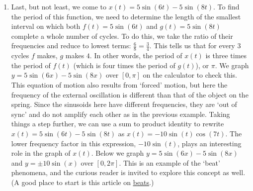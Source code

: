 {\begin{enumerate}
{}


\item Last, but not least, we come to  $x(t) = 5\sin(6t) - 5\sin(8t)$.  To find the period of this function, we need to determine the length of the smallest interval on which both $f(t) = 5\sin(6t)$ and $g(t) = 5\sin(8t)$ complete a whole number of cycles.  To do this, we take the ratio of their frequencies and reduce to lowest terms:  $\frac{6}{8} = \frac{3}{4}$.  This tells us that for every $3$ cycles $f$ makes, $g$ makes $4$. In other words, the period of $x(t)$ is three times the period of $f(t)$ (which is four times the period of $g(t)$), or $\pi$.  We graph $y = 5\sin(6x) - 5\sin(8x)$ over $[0,\pi]$ on the calculator to check this.  This equation of motion also results from `forced' motion, but here the frequency of the external oscillation is different than that of the object on the spring.  Since the sinusoids here have different frequencies, they are `out of sync' and  do not amplify each other as in the previous example.  Taking things a step further, we can use a sum to product identity to rewrite $x(t) = 5\sin(6t) - 5\sin(8t)$ as $x(t) = -10 \sin(t) \cos(7t)$.  The lower frequency factor in this expression,  $-10\sin(t)$, plays an interesting role in the graph of $x(t)$.  Below we graph $y = 5\sin(6x) - 5\sin(8x)$ and $y = \pm 10 \sin(x)$ over $[0,2\pi]$.  This is an example of the `beat' phenomena, and the curious reader is invited to explore this concept as well. (A good place to start is this article on \href{http://en.wikipedia.org/wiki/Beat_(acoustics)}{\underline{beats}}.)


\end{enumerate}}
